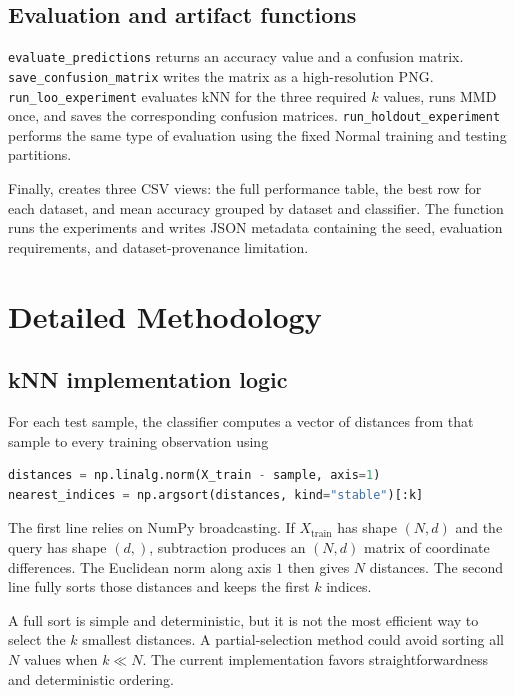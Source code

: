 \documentclass[11pt,a4paper]{article}
\newcommand{\code}[1]{\texttt{\detokenize{#1}}}
\begin{document}
\subsection{Evaluation and artifact functions}

\nolinkurl{evaluate_predictions} returns an accuracy value and a confusion matrix. \nolinkurl{save_confusion_matrix} writes the matrix as a high-resolution PNG. \nolinkurl{run_loo_experiment} evaluates kNN for the three required $k$ values, runs MMD once, and saves the corresponding confusion matrices. \nolinkurl{run_holdout_experiment} performs the same type of evaluation using the fixed Normal training and testing partitions.

Finally, \code{save_results} creates three CSV views: the full performance table, the best row for each dataset, and mean accuracy grouped by dataset and classifier. The \code{main} function runs the experiments and writes JSON metadata containing the seed, evaluation requirements, and dataset-provenance limitation.

\section{Detailed Methodology}

\subsection{kNN implementation logic}

For each test sample, the classifier computes a vector of distances from that sample to every training observation using
\begin{lstlisting}[language=Python]
distances = np.linalg.norm(X_train - sample, axis=1)
nearest_indices = np.argsort(distances, kind="stable")[:k]
\end{lstlisting}

The first line relies on NumPy broadcasting. If $X_{\mathrm{train}}$ has shape $(N,d)$ and the query has shape $(d,)$, subtraction produces an $(N,d)$ matrix of coordinate differences. The Euclidean norm along axis $1$ then gives $N$ distances. The second line fully sorts those distances and keeps the first $k$ indices.

A full sort is simple and deterministic, but it is not the most efficient way to select the $k$ smallest distances. A partial-selection method could avoid sorting all $N$ values when $k\ll N$. The current implementation favors straightforwardness and deterministic ordering.
\end{document}

